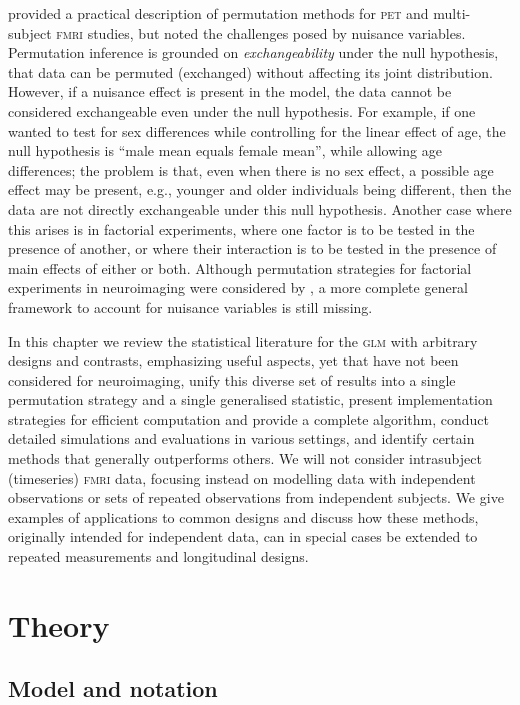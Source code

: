 \citet{Nichols2002} provided a practical description of permutation methods for \textsc{pet} and multi-subject \textsc{fmri} studies, but noted the challenges posed by nuisance variables. Permutation inference is grounded on \emph{exchangeability} under the null hypothesis, that data can be permuted (exchanged) without affecting its joint distribution. However, if a nuisance effect is present in the model, the data cannot be considered exchangeable even under the null hypothesis.  For example, if one wanted to test for sex differences while controlling for the linear effect of age, the null hypothesis is ``male mean equals female mean'', while allowing age differences; the problem is that, even when there is no sex effect, a possible age effect may be present, e.g., younger and older individuals being different, then the data are not directly exchangeable under this null hypothesis. Another case where this arises is in factorial experiments, where one factor is to be tested in the presence of another, or where their interaction is to be tested in the presence of main effects of either or both. Although permutation strategies for factorial experiments in neuroimaging were considered by \citet{Suckling2004}, a more complete general framework to account for nuisance variables is still missing.

In this chapter we review the statistical literature for the \textsc{glm} with arbitrary designs and contrasts, emphasizing useful aspects, yet that have not been considered for neuroimaging, unify this diverse set of results into a single permutation strategy and a single generalised statistic, present implementation strategies for efficient computation and provide a complete algorithm, conduct detailed simulations and evaluations in various settings, and identify certain methods that generally outperforms others. We will not consider intrasubject (timeseries) \textsc{fmri} data, focusing instead on modelling data with independent observations or sets of repeated observations from independent subjects. We give examples of applications to common designs and discuss how these methods, originally intended for independent data, can in special cases be extended to repeated measurements and longitudinal designs.

\section{Theory}

\subsection{Model and notation}
\label{sec:perm:model}


